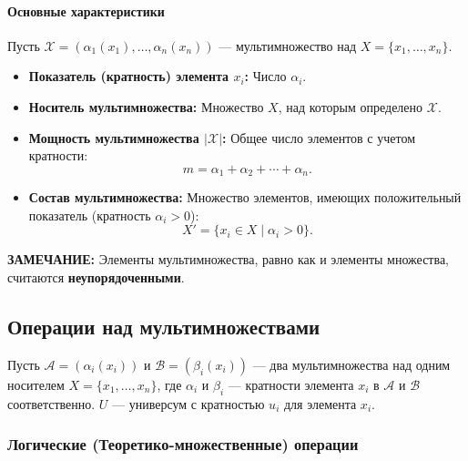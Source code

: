\paragraph{Основные характеристики}
Пусть $\mathcal{X} = (\alpha_1(x_1), \ldots, \alpha_n(x_n))$ --- мультимножество над $X = \{x_1, \ldots, x_n\}$.
\begin{itemize}
    \item \textbf{Показатель (кратность) элемента $x_i$:} Число $\alpha_i$.
    \item \textbf{Носитель мультимножества:} Множество $X$, над которым определено $\mathcal{X}$.
    \item \textbf{Мощность мультимножества $|\mathcal{X}|$:} Общее число элементов с учетом кратности:
    $$m = \alpha_1 + \alpha_2 + \cdots + \alpha_n.$$
    \item \textbf{Состав мультимножества:} Множество элементов, имеющих положительный показатель (кратность $\alpha_i > 0$):
    $$X' = \{x_i \in X \mid \alpha_i > 0\}.$$
\end{itemize}
\textbf{ЗАМЕЧАНИЕ:} Элементы мультимножества, равно как и элементы множества, считаются \textbf{неупорядоченными}.

\subsection*{Операции над мультимножествами}

Пусть $\mathcal{A} = (\alpha_i(x_i))$ и $\mathcal{B} = (\beta_i(x_i))$ --- два мультимножества над одним носителем $X = \{x_1, \ldots, x_n\}$, где $\alpha_i$ и $\beta_i$ --- кратности элемента $x_i$ в $\mathcal{A}$ и $\mathcal{B}$ соответственно. $U$ --- универсум с кратностью $u_i$ для элемента $x_i$.

\subsubsection*{Логические (Теоретико-множественные) операции}


